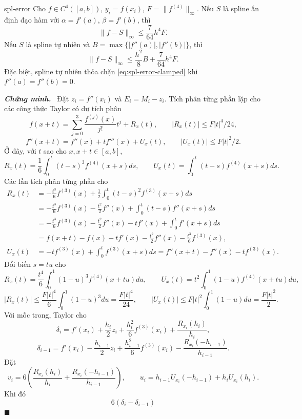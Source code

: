 \documentclass[12pt,a4paper,oneside]{book}
\numberwithin{algorithm}{chapter}
\theoremstyle{definition}
\newenvironment{chungminh}{\par\medskip\noindent\textbf{\textit{\color{mainblue}Chứng minh.}}\ }{\hfill$\blacksquare$\par\medskip}
\begin{document}
\begin{dinhly}{}{spl-error}
Cho $f\in C^4([a,b])$, $y_i=f(x_i)$, $F=\|f^{(4)}\|_\infty$. Nếu $S$ là spline ấn định đạo hàm với $\alpha=f'(a)$, $\beta=f'(b)$, thì
\begin{equation}\label{eq:spl-error-clamped}
 \|f-S\|_\infty\leq\frac7{64}h^4F.
\end{equation}
Nếu $S$ là spline tự nhiên và $B=\max\{|f''(a)|,|f''(b)|\}$, thì
\begin{equation}\label{eq:spl-error-natural}
 \|f-S\|_\infty\leq\frac{h^2}8B+\frac7{64}h^4F.
\end{equation}
Đặc biệt, spline tự nhiên thỏa chặn \eqref{eq:spl-error-clamped} khi $f''(a)=f''(b)=0$.
\end{dinhly}
\begin{chungminh}
Đặt $z_i=f''(x_i)$ và $E_i=M_i-z_i$. Tích phân từng phần lặp cho các công thức Taylor có dư tích phân
\[
 f(x+t)=\sum_{j=0}^3\frac{f^{(j)}(x)}{j!}t^j+R_x(t),\qquad
 |R_x(t)|\leq F|t|^4/24,
\]
\[
 f''(x+t)=f''(x)+tf'''(x)+U_x(t),\qquad |U_x(t)|\leq F|t|^2/2.
\]
Ở đây, với $t$ sao cho $x,x+t\in[a,b]$,
\[
 R_x(t)=\frac16\int_0^t(t-s)^3f^{(4)}(x+s)ds,\qquad
 U_x(t)=\int_0^t(t-s)f^{(4)}(x+s)ds.
\]
Các lần tích phân từng phần cho
\begin{align*}
 R_x(t)
 &=-\frac{t^3}6f^{(3)}(x)
   +\frac12\int_0^t(t-s)^2f^{(3)}(x+s)ds\\
 &=-\frac{t^3}6f^{(3)}(x)-\frac{t^2}2f''(x)
   +\int_0^t(t-s)f''(x+s)ds\\
 &=-\frac{t^3}6f^{(3)}(x)-\frac{t^2}2f''(x)-tf'(x)
   +\int_0^tf'(x+s)ds\\
 &=f(x+t)-f(x)-tf'(x)-\frac{t^2}2f''(x)-\frac{t^3}6f^{(3)}(x),\\
 U_x(t)&=-tf^{(3)}(x)+\int_0^tf^{(3)}(x+s)ds
        =f''(x+t)-f''(x)-tf^{(3)}(x).
\end{align*}
Đổi biến $s=tu$ cho
\[
 R_x(t)=\frac{t^4}6\int_0^1(1-u)^3f^{(4)}(x+tu)du,\qquad
 U_x(t)=t^2\int_0^1(1-u)f^{(4)}(x+tu)du,
\]
\[
 |R_x(t)|\leq\frac{F|t|^4}6\int_0^1(1-u)^3du=\frac{F|t|^4}{24},
 \qquad |U_x(t)|\leq F|t|^2\int_0^1(1-u)du=\frac{F|t|^2}2.
\] Với mốc trong, Taylor cho
\[
 \delta_i=f'(x_i)+\frac{h_i}2z_i+\frac{h_i^2}6f^{(3)}(x_i)
              +\frac{R_{x_i}(h_i)}{h_i},
\]
\[
 \delta_{i-1}=f'(x_i)-\frac{h_{i-1}}2z_i+\frac{h_{i-1}^2}6f^{(3)}(x_i)
              -\frac{R_{x_i}(-h_{i-1})}{h_{i-1}}.
\]
Đặt
\[
 v_i=6\left(\frac{R_{x_i}(h_i)}{h_i}
             +\frac{R_{x_i}(-h_{i-1})}{h_{i-1}}\right),\qquad
 u_i=h_{i-1}U_{x_i}(-h_{i-1})+h_iU_{x_i}(h_i).
\]
Khi đó
\[
 6(\delta_i-\delta_{i-1})
\]
\end{chungminh}
\end{document}
